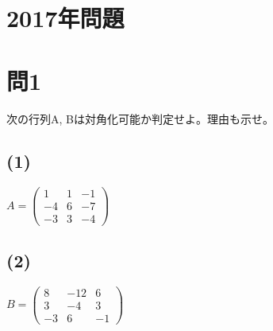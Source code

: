 ﻿\documentclass{jsarticle}
\begin{document}
\newpage
\section*{2017年問題}
\section*{問1}
次の行列A, Bは対角化可能か判定せよ。理由も示せ。
\subsection*{(1) }
$
A = \left(
   \begin{array}{ccr}
    1 & 1 & -1 \\-4 & 6 & -7 \\-3 & 3 & -4
   \end{array}
     \right)
$
\\
\subsection*{(2)}
$
B = \begin{pmatrix}
    8 & -12 & 6 \\
    3 & -4 & 3 \\
    -3 & 6 & -1
    \end{pmatrix}
$   \\
\end{document}
